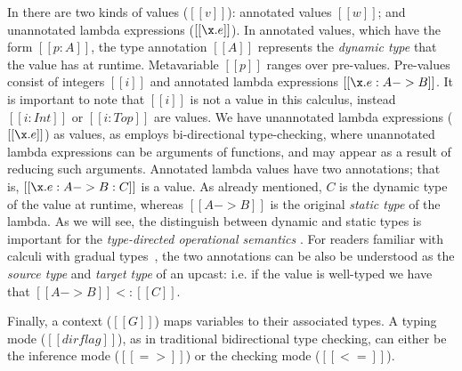 In \name there are two kinds of values ($[[v]]$): annotated values $[[w]]$; and unannotated
lambda expressions ($[[\x.e]]$). In annotated values, which have the form $[[p
:A]]$, the type annotation $[[A]]$ represents the \textit{dynamic type} that the
value has at runtime.
Metavariable $[[p]]$ ranges over pre-values. Pre-values
consist of integers $[[i]]$
and annotated lambda expressions $[[\x.e : A -> B]]$.
It is important to note that $[[i]]$ is not a value in this
calculus, instead $[[i:Int]]$ or $[[i:Top]]$ are values.
We have unannotated lambda expressions ($[[\x.e]]$) as values, as
\name employs bi-directional type-checking, where
unannotated lambda expressions can be arguments of functions, and
may appear as a result of reducing such arguments.
Annotated lambda values have two annotations;
that is, $[[\x.e : A -> B : C]]$ is a value.
As already mentioned, $C$ is the dynamic type of the value
at runtime, whereas $[[A -> B]]$ is the original \emph{static type} of the lambda.
As we will see, the distinguish between dynamic and static
types is important for the \textit{type-directed operational semantics}
\cite{Huang:typedirected}.
For readers familiar with calculi with gradual types~\cite{}, the two annotations
can be also be understood as the \emph{source type} and \emph{target type}
of an upcast: i.e. if the value is well-typed we have that $[[A -> B]] <: [[C]]$.

Finally, a context ($[[G]]$) maps variables to their associated types. A typing
mode ($[[dirflag]]$), as in traditional bidirectional type checking, can either be the
inference mode ($[[=>]]$) or the checking mode ($[[<=]]$).

